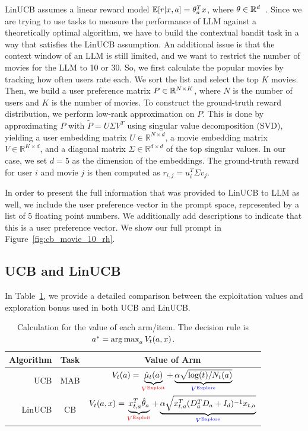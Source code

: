 LinUCB assumes a linear reward model $\mathbb{E}[r|x, a] = \theta_a^T x$, where $\theta \in \mathbb{R}^d$~\citep{chu2011contextual}. Since we are trying to use tasks to measure the performance of LLM against a theoretically optimal algorithm, we have to build the contextual bandit task in a way that satisfies the LinUCB assumption. An additional issue is that the context window of an LLM is still limited, and we want to restrict the number of movies for the LLM to 10 or 30. So, we first calculate the popular movies by tracking how often users rate each. We sort the list and select the top $K$ movies. 
Then, we build a user preference matrix $P \in \mathbb{R}^{N \times K}$, where $N$ is the number of users and $K$ is the number of movies.  
To construct the ground-truth reward distribution, we perform low-rank approximation on $P$.
This is done by approximating $P$ with $\tilde{P} = U \Sigma V^T$ using singular value decomposition (SVD), yielding a user embedding matrix $U \in \mathbb{R}^{N \times d}$, a movie embedding matrix $V \in \mathbb{R}^{K \times d}$, and a diagonal matrix $\Sigma \in \mathbb{R}^{d \times d}$ of the top singular values. In our case, we set $d=5$ as the dimension of the embeddings. The ground-truth reward for user $i$ and movie $j$ is then computed as $r_{i,j} = u_i^T \Sigma v_j$.

In order to present the full information that was provided to LinUCB to LLM as well, we include the user preference vector in the prompt space, represented by a list of 5 floating point numbers. We additionally add descriptions to indicate that this is a user preference vector. We show our full prompt in Figure~\ref{fig:cb_movie_10_rh}.


\subsection{UCB and LinUCB}
In Table~\ref{tab:mab_cb_eq}, we provide a detailed comparison between the exploitation values and exploration bonus used in both UCB and LinUCB.

\begin{table}[h]
\centering
\begin{tabular}{@{}r|c|c@{}}
\toprule
Algorithm & Task & Value of Arm \\ \midrule
UCB       & MAB  &     $V_t(a) = \underbrace{\hat\mu_t(a) \vphantom{\alpha\log(t)/N_t(a)}}_{\textcolor{red}{V^\text{Exploit}}} + \underbrace{\alpha\sqrt{\log(t)/N_t(a)}}_{\textcolor{blue}{V^\text{Explore}}}$         \\ \midrule 
LinUCB    & CB   &       $V_t(a, x) = \underbrace{x_{t,a}^T\hat\theta_a}_{\textcolor{red}{V^\text{Exploit}}} + \underbrace{\alpha\sqrt{x^T_{t,a}(D^T_aD_a+I_d)^{-1}x_{t,a}}}_{\textcolor{blue}{V^\text{Explore}}}$ \\ \bottomrule 
\end{tabular}
\caption{Calculation for the value of each arm/item. The decision rule is $a^* = \operatorname*{arg\,max}_a V_t (a, x)$.}
\label{tab:mab_cb_eq}
\end{table}

